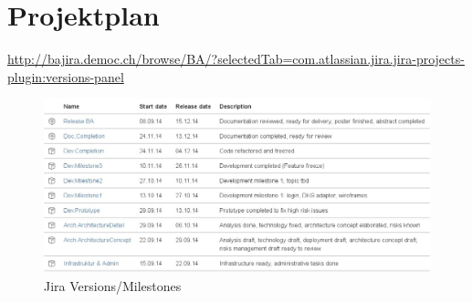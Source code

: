 \chapter*{Projektplan}
	
	\hyperlink{http://bajira.democ.ch/browse/BA/?selectedTab=com.atlassian.jira.jira-projects-plugin:versions-panel}{http://bajira.democ.ch/browse/BA/?selectedTab=com.atlassian.jira.jira-projects-plugin:versions-panel}


	\begin{figure}[H]
		\includegraphics[width=\textwidth]{projectPlan/media/img/jiraVersions.jpg}
		\centering
		\caption{Jira Versions/Milestones}
		\label{fig:jiraVersions}
	\end{figure}